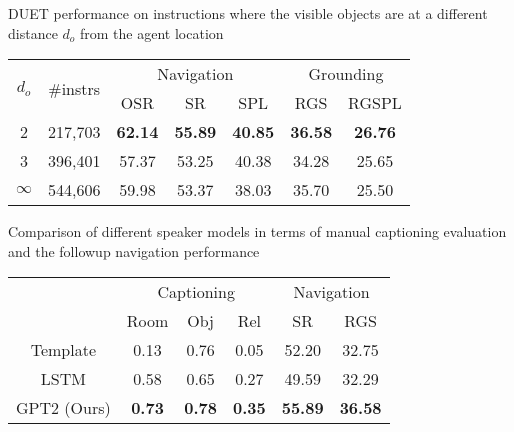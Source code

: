 \begin{minipage}[t]{\linewidth}
\begin{minipage}[t]{0.45\linewidth}
\makeatletter{}
\tabcolsep=0.05cm
\scriptsize
\caption{DUET performance on instructions where the visible objects are at a different distance $d_o$ from the agent location}
\label{tab:rvr_depth_obj_filter}
\begin{tabular}{ccccccc} \toprule
\multirow{2}{*}{$d_o$} & \multirow{2}{*}{\#instrs} & \multicolumn{3}{c}{Navigation} & \multicolumn{2}{c}{Grounding} \\
&  & OSR & SR & SPL & RGS & RGSPL \\ \midrule
    2 & 217,703 &\textbf{62.14} & \textbf{55.89} & \textbf{40.85} & \textbf{36.58} & \textbf{26.76} \\
    3 & 396,401 & 57.37 & 53.25 & 40.38 & 34.28 & 25.65 \\ 
    $\infty$ & 544,606 & 59.98 & 53.37 & 38.03 & 35.70 & 25.50 \\ \bottomrule
\end{tabular}
\end{minipage}
\quad
\begin{minipage}[t]{0.48\linewidth}
\makeatletter{}
\tabcolsep=0.05cm
\scriptsize
\centering
\caption{Comparison of different speaker models in terms of manual captioning evaluation and the followup navigation performance}
\label{tab:instr_eval}
\begin{tabular}{cccccc} \toprule
 & \multicolumn{3}{c}{Captioning} & \multicolumn{2}{c}{Navigation} \\
 & Room & Obj & Rel & SR & RGS \\ \midrule
Template & 0.13 & 0.76 & 0.05 & 52.20 & 32.75 \\
LSTM & 0.58 & 0.65 & 0.27 & 49.59 & 32.29 \\
GPT2 (Ours) & \textbf{0.73} & \textbf{0.78} & \textbf{0.35} & \textbf{55.89} & \textbf{36.58} \\ \bottomrule
\end{tabular}
\end{minipage}
\end{minipage}




